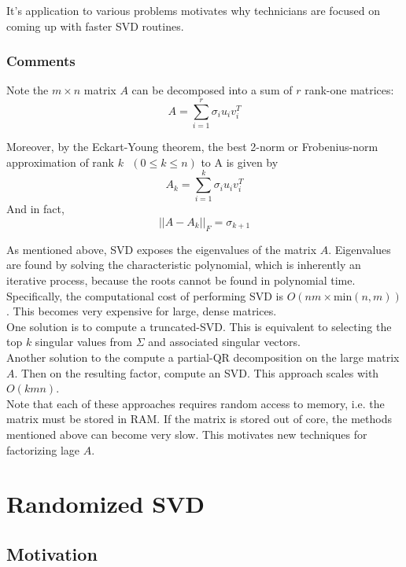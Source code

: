 \documentclass{article}
\begin{document}
It's application to various problems motivates why technicians are focused on coming up with faster SVD routines.

\subsubsection{Comments}

Note the $m \times n$ matrix $A$ can be decomposed into a sum of $r$ rank-one matrices:
\begin{equation}
A = \sum_{i=1}^{r}\sigma_{i}u_{i}v^{T}_{i}
\end{equation}

Moreover, by the Eckart-Young theorem, the best 2-norm or Frobenius-norm approximation of rank $k\text{ }(0 \leq k \leq n)$ to A is given by $$A_{k} = \sum_{i=1}^{k}\sigma_{i}u_{i}v^{T}_{i}$$
And in fact, $$||A-A_{k}||_{F} = \sigma_{k+1}$$

As mentioned above, SVD exposes the eigenvalues of the matrix $A$. Eigenvalues are found by solving the characteristic polynomial, which is inherently an iterative process, because the roots cannot be found in polynomial time. Specifically, the computational cost of performing SVD is $O(nm\times \text{min}(n,m))$. This becomes very expensive for large, dense matrices. 
\\

One solution is to compute a truncated-SVD. This is equivalent to selecting the top $k$ singular values from $\Sigma$ and associated singular vectors.
\\

Another solution to the compute a partial-QR decomposition on the large matrix $A$. Then on the resulting factor, compute an SVD. This approach scales with $O(kmn)$.
\\

Note that each of these approaches requires random access to memory, i.e. the matrix must be stored in RAM. If the matrix is stored out of core, the methods mentioned above can become very slow. This motivates new techniques for factorizing lage $A$.
\\

\section{Randomized SVD}

\subsection{Motivation}
\end{document}
